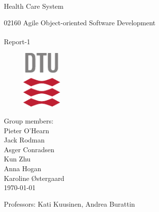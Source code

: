 \begin{titlepage}
	\begin{center}
		\rule{0pt}{0pt}
		\vfill
		\vfill
		\begin{minipage}{0.8\textwidth}
			\centering
			\begin{huge}
				Health Care System\\[0.75ex]
			\end{huge}
			\begin{LARGE}
				02160 Agile Object-oriented Software Development\\
				\noindent\makebox[\linewidth]{\rule{\textwidth}{0.4pt}}\\[0.75ex]
				Report-1\\[0.75ex]
				\noindent\makebox[\linewidth]{\rule{\textwidth}{0.4pt}}
			\end{LARGE}
		\end{minipage}
		\vfill
		\vfill

		\begin{figure}[h!]
		\begin{center}
			\includegraphics[width=2cm]{Figures/DTUlogo.pdf}
		\end{center}
		\end{figure}

		\vfill
		\vfill

		\vspace*{.5cm}
		Group members:\\
		\vspace*{.3cm}
		Pieter O'Hearn\\
		Jack Rodman\\
		Asger Conradsen\\
		Kun Zhu\\
		Anna Hogan\\
		Karoline Østergaard\\
		\vspace{.5cm}
		\today \\

		\vfill
		\vfill

		Professors:
		Kati Kuusinen, Andrea Burattin\

	\end{center}
\end{titlepage}
